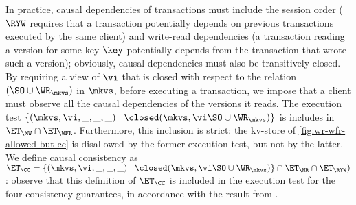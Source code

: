 In practice, causal dependencies of transactions must include the session order ($\RYW$ requires that 
a transaction potentially depends on previous transactions executed by the same client) and 
write-read dependencies (a transaction reading a version for some key $\key$ potentially depends from the transaction 
that wrote such a version); obviously, causal dependencies must also be transitively closed. 
By requiring a view of $\vi$ that is closed with respect to the relation $(\SO \cup \WR_{\mkvs})$ in $\mkvs$, 
before executing a transaction, we impose that a client must observe all the causal dependencies of the 
versions it reads. The execution test $\{(\mkvs, \vi, \_, \_, \_) \mid \closed(\mkvs, \vi \SO \cup \WR_{\mkvs})\}$ is
includes in $\ET_{\MW} \cap \ET_{\WFR}$. Furthermore, this inclusion is strict: the kv-store of 
\cref{fig:wr-wfr-allowed-but-cc} is disallowed by the former execution test, but not by the latter. 
We define causal consistency as $\ET_{\CC} = \{(\mkvs, \vi, \_, \_, \_) \mid \closed(\mkvs, \vi \SO \cup \WR_{\mkvs})\} 
\cap \ET_{\MR} \cap \ET_{\RYW})$: observe that this definition of $\ET_{\CC}$ is included in the execution 
test for the four consistency guarantees, in accordance with the result from .
%
